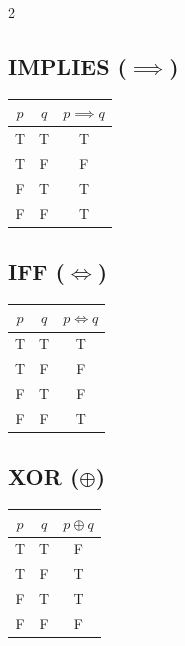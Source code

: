 \begin{multicols}{2}
	\subsection*{IMPLIES (\(\implies\))}

	\begin{tabular}{|c|c|c|}
		\toprule
		\(p\) & \(q\) & \(p \implies q\) \\
		\midrule
		T     & T     & T                \\
		T     & F     & F                \\
		F     & T     & T                \\
		F     & F     & T                \\
		\bottomrule
	\end{tabular}

	\columnbreak

	\subsection*{IFF (\(\iff\))}

	\begin{tabular}{|c|c|c|}
		\toprule
		\(p\) & \(q\) & \(p \iff q\) \\
		\midrule
		T     & T     & T            \\
		T     & F     & F            \\
		F     & T     & F            \\
		F     & F     & T            \\
		\bottomrule
	\end{tabular}

	\vspace{1em}

	\subsection*{XOR (\(\oplus\))}

	\begin{tabular}{|c|c|c|}
		\toprule
		\(p\) & \(q\) & \(p \oplus q\) \\
		\midrule
		T     & T     & F              \\
		T     & F     & T              \\
		F     & T     & T              \\
		F     & F     & F              \\
		\bottomrule
	\end{tabular}

	\vspace{1em}


\end{multicols}
